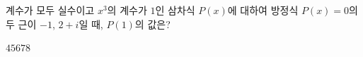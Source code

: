 계수가 모두 실수이고 $x^3$의 계수가 $1$인 삼차식 $P(x)$에 대하여 방정식 $P(x)=0$의 두 근이 $-1$, $2+i$일 때, $P(1)$의 값은?
\begin{choices32}{$4$}{$5$}{$6$}{$7$}{$8$}\end{choices32}
